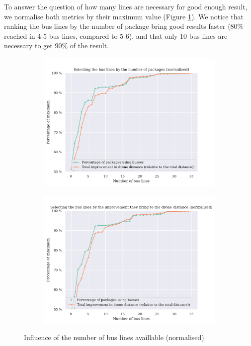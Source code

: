 To answer the question of how many lines are necessary for good enough result, we normalise both metrics by their maximum value (Figure \ref{fig:lines_relative}). We notice that ranking the bus lines by the number of package bring good results faster ($80 \%$ reached in 4-5 bus lines, compared to 5-6), and that only 10 bus lines are necessary to get $90 \%$ of the result.

\begin{figure}
    \centering
    \begin{subfigure}[t]{0.49\linewidth}
        \centering
        \includegraphics[width=\linewidth]{"../fig/buslines_number_norm.pdf"}
    \end{subfigure}
    \begin{subfigure}[t]{0.49\linewidth}
        \centering
        \includegraphics[width=\linewidth]{"../fig/buslines_improvement_norm.pdf"}
    \end{subfigure}
    \caption{Influence of the number of bus lines availlable (normalised)}
    \label{fig:lines_relative}
\end{figure}

